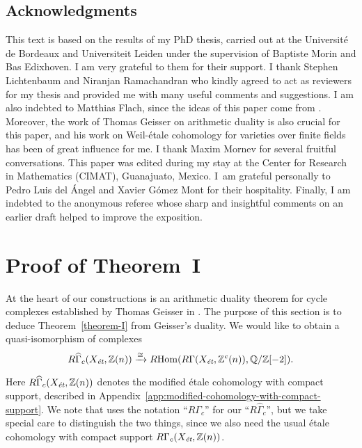 \documentclass[leqno,12pt]{article}
\theoremstyle{plain}
\theoremstyle{definition}
\DeclareMathOperator{\Hom}{Hom}
\newcommand{\QQ}{\mathbb{Q}}
\newcommand{\ZZ}{\mathbb{Z}}
\newcommand{\et}{\text{\it \'{e}t}}
\newcommand{\RHom}{R\!\Hom}
\begin{document}
{\small
\subsection*{Acknowledgments}

This text is based on the results of my PhD thesis, carried out at the
Universit\'{e} de Bordeaux and Universiteit Leiden under the supervision of
Baptiste Morin and Bas Edixhoven. I am very grateful to them for their
support. I thank Stephen Lichtenbaum and Niranjan Ramachandran who kindly agreed
to act as reviewers for my thesis and provided me with many useful comments and
suggestions. I am also indebted to Matthias Flach, since the ideas of this paper
come from \cite{Flach-Morin-2018}. Moreover, the work of Thomas Geisser on
arithmetic duality \cite{Geisser-2010} is also crucial for this paper, and his
work on Weil-\'{e}tale cohomology for varieties over finite fields
\cite{Geisser-2004,Geisser-2006,Geisser-2010-arithmetic-homology} has been of
great influence for me. I thank Maxim Mornev for several fruitful
conversations. This paper was edited during my stay at the Center for Research
in Mathematics (CIMAT), Guanajuato, Mexico. I~am grateful personally to Pedro
Luis del \'{A}ngel and Xavier G\'{o}mez Mont for their hospitality.
Finally, I am indebted to the anonymous referee whose sharp and insightful
comments on an earlier draft helped to improve the exposition.}


\section{Proof of Theorem~I}
\label{sec:arithmetic-duality-theorem}

At the heart of our constructions is an arithmetic duality theorem for cycle
complexes established by Thomas Geisser in \cite{Geisser-2010}. The purpose of
this section is to deduce Theorem~\ref{theorem-I} from Geisser's duality.
We would like to obtain a quasi-isomorphism of complexes
\[ R\widehat{\Gamma}_c (X_\et, \ZZ (n)) \xrightarrow{\cong}
  \RHom (R\Gamma (X_\et, \ZZ^c (n)), \QQ/\ZZ [-2]). \]

Here $R\widehat{\Gamma}_c (X_\et, \ZZ (n))$ denotes the modified \'{e}tale
cohomology with compact support, described in
Appendix~\ref{app:modified-cohomology-with-compact-support}. We note that
\cite{Geisser-2010} uses the notation ``$R\Gamma_c$'' for our
``$R\widehat{\Gamma}_c$'', but we take special care to distinguish the two
things, since we also need the usual \'{e}tale cohomology with compact support
$R\Gamma_c (X_\et, \ZZ (n))$.
\end{document}

